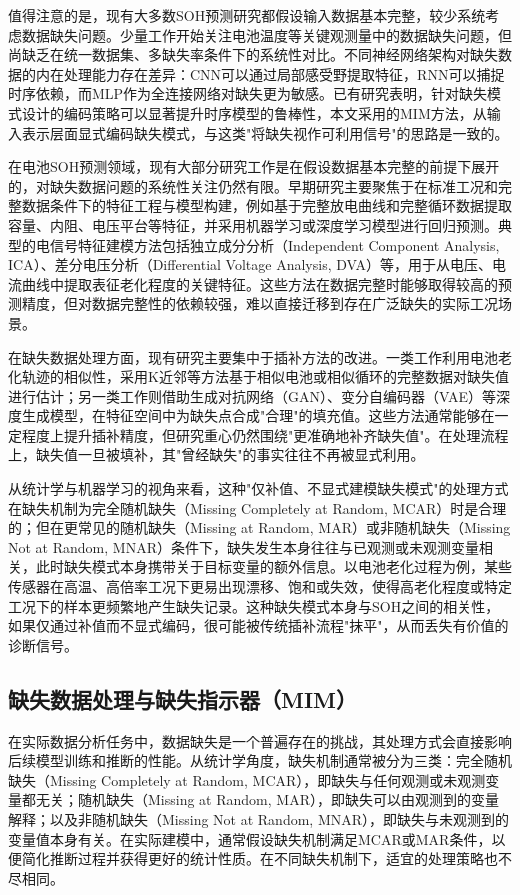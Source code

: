 \documentclass[10pt,a4paper]{ctexart}
\begin{document}
值得注意的是，现有大多数SOH预测研究都假设输入数据基本完整，较少系统考虑数据缺失问题\cite{shao2025soh,deng2025novel}。少量工作开始关注电池温度等关键观测量中的数据缺失问题，但尚缺乏在统一数据集、多缺失率条件下的系统性对比\cite{shao2025soh}。不同神经网络架构对缺失数据的内在处理能力存在差异：CNN可以通过局部感受野提取特征，RNN可以捕捉时序依赖，而MLP作为全连接网络对缺失更为敏感。已有研究表明，针对缺失模式设计的编码策略可以显著提升时序模型的鲁棒性\cite{che2018recurrent}，本文采用的MIM方法，从输入表示层面显式编码缺失模式，与这类"将缺失视作可利用信号"的思路是一致的。

在电池SOH预测领域，现有大部分研究工作是在假设数据基本完整的前提下展开的，对缺失数据问题的系统性关注仍然有限\cite{shao2025soh}。早期研究主要聚焦于在标准工况和完整数据条件下的特征工程与模型构建，例如基于完整放电曲线和完整循环数据提取容量、内阻、电压平台等特征，并采用机器学习或深度学习模型进行回归预测。典型的电信号特征建模方法包括独立成分分析（Independent Component Analysis, ICA）、差分电压分析（Differential Voltage Analysis, DVA）等，用于从电压、电流曲线中提取表征老化程度的关键特征\cite{deng2025novel}。这些方法在数据完整时能够取得较高的预测精度，但对数据完整性的依赖较强，难以直接迁移到存在广泛缺失的实际工况场景。

在缺失数据处理方面，现有研究主要集中于插补方法的改进。一类工作利用电池老化轨迹的相似性，采用K近邻等方法基于相似电池或相似循环的完整数据对缺失值进行估计；另一类工作则借助生成对抗网络（GAN）、变分自编码器（VAE）等深度生成模型，在特征空间中为缺失点合成"合理"的填充值。这些方法通常能够在一定程度上提升插补精度，但研究重心仍然围绕"更准确地补齐缺失值"。在处理流程上，缺失值一旦被填补，其"曾经缺失"的事实往往不再被显式利用。

从统计学与机器学习的视角来看，这种"仅补值、不显式建模缺失模式"的处理方式在缺失机制为完全随机缺失（Missing Completely at Random, MCAR）时是合理的；但在更常见的随机缺失（Missing at Random, MAR）或非随机缺失（Missing Not at Random, MNAR）条件下，缺失发生本身往往与已观测或未观测变量相关，此时缺失模式本身携带关于目标变量的额外信息。以电池老化过程为例，某些传感器在高温、高倍率工况下更易出现漂移、饱和或失效，使得高老化程度或特定工况下的样本更频繁地产生缺失记录。这种缺失模式本身与SOH之间的相关性，如果仅通过补值而不显式编码，很可能被传统插补流程"抹平"，从而丢失有价值的诊断信号。

\subsection{缺失数据处理与缺失指示器（MIM）}

在实际数据分析任务中，数据缺失是一个普遍存在的挑战，其处理方式会直接影响后续模型训练和推断的性能。从统计学角度，缺失机制通常被分为三类：完全随机缺失（Missing Completely at Random, MCAR），即缺失与任何观测或未观测变量都无关；随机缺失（Missing at Random, MAR），即缺失可以由观测到的变量解释；以及非随机缺失（Missing Not at Random, MNAR），即缺失与未观测到的变量值本身有关\cite{little2002statistical}。在实际建模中，通常假设缺失机制满足MCAR或MAR条件，以便简化推断过程并获得更好的统计性质\cite{little2002statistical}。在不同缺失机制下，适宜的处理策略也不尽相同。
\end{document}
